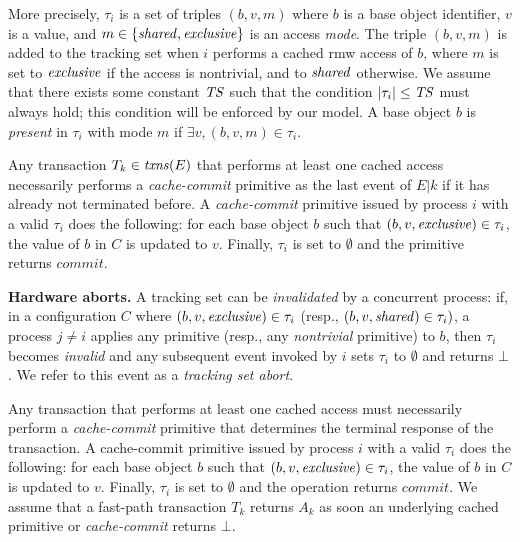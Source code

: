 More precisely, $\tau_i$ is a set of triples $(b, v, m)$ where $b$ is a base object identifier, $v$ is a value, 
and $m \in \{\mathit{shared}, \mathit{exclusive}\}$ is an access \emph{mode}. 
The triple $(b, v, m)$ is added to the tracking set when $i$ performs a cached
rmw access of $b$, where $m$ is set to $\mathit{exclusive}$ if the access is
nontrivial, and to $\mathit{shared}$ otherwise.  
We assume that there exists some constant $\mathit{TS}$
such that the condition $|\tau_i| \leq \mathit{TS}$ must always hold; this
condition will be enforced by our model.
A base object $b$ is \emph{present} in $\tau_i$ with mode $m$ if $\exists v, (b,v,m) \in \tau_i$.

Any transaction $T_k \in \ms{txns}(E)$ that performs at least one cached access necessarily performs a \emph{cache-commit} primitive as the last event of $E|k$ if it has already not terminated before. 
A \emph{cache-commit} primitive issued by process $i$ with
a valid $\tau_i$ does the following: for each base object $b$ such that $(b,v,\mathit{exclusive}) \in \tau_i$, the value of $b$ in $C$ is updated to $v$. 
Finally, $\tau_i$ is set to $\emptyset$ and the primitive 
returns $\textit{commit}$. 
%

\vspace{1mm}\noindent\textbf{Hardware aborts.}
A tracking set can be \emph{invalidated} by a concurrent process: 
if, in a configuration $C$ where  $(b,v,\mathit{exclusive})\in\tau_i$
(resp., $(b,v,\mathit{shared})\in\tau_i)$,  a process $j\neq i$ applies any primitive 
(resp., any \emph{nontrivial} primitive) to $b$, then $\tau_i$ becomes
\emph{invalid} and any subsequent event invoked by $i$
sets $\tau_i$ to $\emptyset$ and returns $\bot$. We refer to this event as a \emph{tracking set abort}.

Any transaction that performs at least one cached access must necessarily perform a \emph{cache-commit} primitive 
that determines the terminal response of the transaction.
A cache-commit primitive
issued by process $i$ with
a valid $\tau_i$ does the following: for each base object $b$ such that $(b,v,\mathit{exclusive}) \in \tau_i$, the value of $b$ in $C$ is updated to $v$. 
Finally, $\tau_i$ is set to $\emptyset$ and the operation returns $\textit{commit}$. 
We assume that a fast-path transaction $T_k$ returns $A_k$
as soon an underlying cached primitive or \emph{cache-commit} returns $\bot$.


